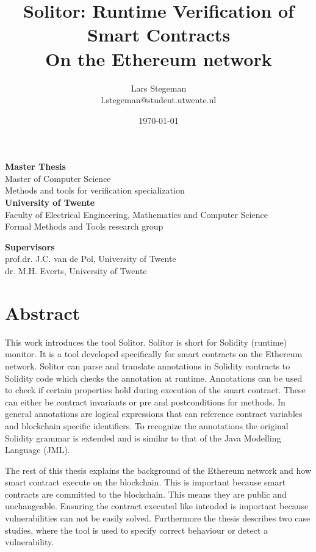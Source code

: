\documentclass[a4paper]{article}
\title{\vspace{3.0cm}\textbf{Solitor: Runtime Verification of Smart Contracts}\\
\large On the Ethereum network \\}
\author{Lars Stegeman\\ l.stegeman@student.utwente.nl}
\date{\vspace{0.5cm}\today}
\begin{document}
\begin{titlepage}
\maketitle
\vspace{1.5cm}
\begin{center}
\textbf{Master Thesis}\\
Master of Computer Science\\
Methods and tools for verification specialization\\
\vspace{0.5cm}
\textbf{University of Twente}\\
Faculty of Electrical Engineering, Mathematics and Computer Science\\
Formal Methods and Tools research group\\
\end{center}
\vfill
\textbf{Supervisors}\\
prof.dr. J.C. van de Pol, University of Twente\\
dr. M.H. Everts, University of Twente\\
\end{titlepage}

\newpage
\section*{Abstract}
This work introduces the tool Solitor. Solitor is short for Solidity (runtime) monitor. It is a tool developed specifically for smart contracts on the Ethereum network. Solitor can parse and translate annotations in Solidity contracts to Solidity code which checks the annotation at runtime. Annotations can be used to check if certain properties hold during execution of the smart contract. These can either be contract invariants or pre and postconditions for methods. In general annotations are logical expressions that can reference contract variables and blockchain specific identifiers. To recognize the annotations the original Solidity grammar is extended and is similar to that of the Java Modelling Language (JML). \par
The rest of this thesis explains the background of the Ethereum network and how smart contract execute on the blockchain. This is important because smart contracts are committed to the blockchain. This means they are public and unchangeable. Ensuring the contract executed like intended is important because vulnerabilities can not be easily solved. Furthermore the thesis describes two case studies, where the tool is used to specify correct behaviour or detect a vulnerability. 
\newpage
\tableofcontents
\newpage
\end{document}
